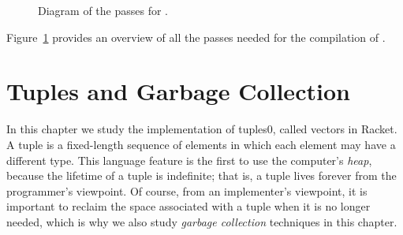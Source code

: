 \documentclass[7x10]{TimesAPriori_MIT}%
\def\racketEd{0}
\def\edition{1}
\newcommand{\racket}[1]{{\if\edition\racketEd{#1}\fi}}
\numberwithin{theorem}{chapter}
\numberwithin{definition}{chapter}
\numberwithin{equation}{chapter}
\begin{document}
\begin{figure}[tp]
\begin{tcolorbox}[colback=white]
{
\fi}
\end{tcolorbox}

\caption{Diagram of the passes for \LangLoop{}.}
\label{fig:Lwhile-passes}
\end{figure}

Figure~\ref{fig:Lwhile-passes} provides an overview of all the passes needed
for the compilation of \LangLoop{}.






\chapter{Tuples and Garbage Collection}
\label{ch:Lvec}
\setcounter{footnote}{0}


In this chapter we study the implementation of tuples\racket{, called
  vectors in Racket}.  A tuple is a fixed-length sequence of elements
in which each element may have a different type.
%
This language feature is the first to use the computer's
\emph{heap}, because the lifetime of a tuple is
indefinite; that is, a tuple lives forever from the programmer's
viewpoint. Of course, from an implementer's viewpoint, it is important
to reclaim the space associated with a tuple when it is no longer
needed, which is why we also study \emph{garbage collection}
 techniques in this chapter.
\end{document}
